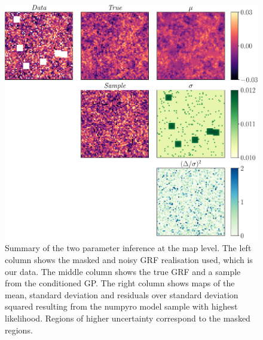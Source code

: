 \begin{figure}[h]
    \centering
    \includegraphics[width=\textwidth]{images/5_summary.pdf}
    \caption{\label{fig:MCMC summary} Summary of the two parameter inference at the map level. The left column shows the masked and noisy GRF realisation used, which is our data. The middle column shows the true GRF and a sample from the conditioned GP. The right column shows maps of the mean, standard deviation and residuals over standard deviation squared resulting from the numpyro model sample with highest likelihood. Regions of higher uncertainty correspond to the masked regions.}
\end{figure}